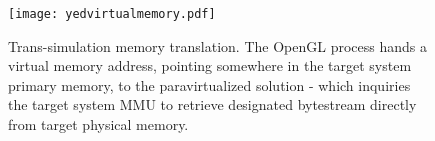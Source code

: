 
\begin{figure}
\centering

\texttt{[image: yedvirtualmemory.pdf]}

\caption{Trans-simulation memory translation. The OpenGL process hands a virtual memory address, pointing somewhere in the target system primary memory, to the paravirtualized solution - which inquiries the target system MMU to retrieve designated bytestream directly from target physical memory.} %
\label{fig:virtualmemory}

\end{figure}